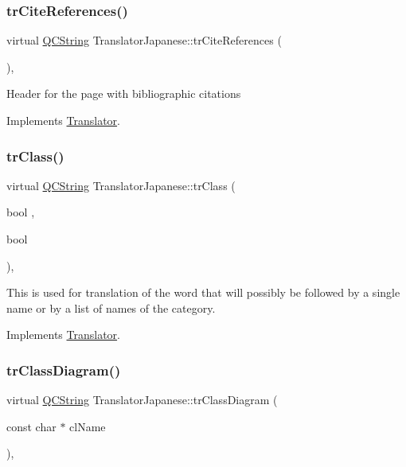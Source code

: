 \subsubsection{\texorpdfstring{trCiteReferences()}{trCiteReferences()}}
{\footnotesize\ttfamily virtual \mbox{\hyperlink{class_q_c_string}{Q\+C\+String}} Translator\+Japanese\+::tr\+Cite\+References (\begin{DoxyParamCaption}{ }\end{DoxyParamCaption})\hspace{0.3cm}{\ttfamily [inline]}, {\ttfamily [virtual]}}

Header for the page with bibliographic citations 

Implements \mbox{\hyperlink{class_translator}{Translator}}.

\mbox{\label{class_translator_japanese_aa06bfdcdbfe8c2b59abbbb754a9598fe}} 
\subsubsection{\texorpdfstring{trClass()}{trClass()}}
{\footnotesize\ttfamily virtual \mbox{\hyperlink{class_q_c_string}{Q\+C\+String}} Translator\+Japanese\+::tr\+Class (\begin{DoxyParamCaption}\item[{bool}]{,  }\item[{bool}]{ }\end{DoxyParamCaption})\hspace{0.3cm}{\ttfamily [inline]}, {\ttfamily [virtual]}}

This is used for translation of the word that will possibly be followed by a single name or by a list of names of the category. 

Implements \mbox{\hyperlink{class_translator}{Translator}}.

\mbox{\label{class_translator_japanese_a61c23fa737e941bf024f7092369a6809}} 
\subsubsection{\texorpdfstring{trClassDiagram()}{trClassDiagram()}}
{\footnotesize\ttfamily virtual \mbox{\hyperlink{class_q_c_string}{Q\+C\+String}} Translator\+Japanese\+::tr\+Class\+Diagram (\begin{DoxyParamCaption}\item[{const char $\ast$}]{cl\+Name }\end{DoxyParamCaption})\hspace{0.3cm}{\ttfamily [inline]}, {\ttfamily [virtual]}}

